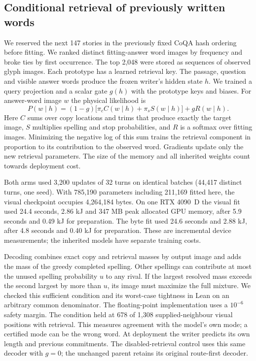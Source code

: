 \documentclass[12pt,a4paper]{article}
\providecommand{\DIFadd}[1]{{\protect\color{blue} \sf #1}} %
\begin{document}
\subsection*{\DIFadd{Conditional retrieval of previously written words}}
\DIFadd{We reserved the next 147 stories in the previously fixed CoQA hash ordering before fitting. We ranked distinct fitting-answer word images by frequency and broke ties by first occurrence. The top 2,048 were stored as sequences of observed glyph images. Each prototype has a learned retrieval key. The passage, question and visible answer words produce the frozen writer's hidden state $h$. We trained a query projection and a scalar gate $g(h)$ with the prototype keys and biases. For answer-word image $w$ the physical likelihood is
}\[
P(w\mid h)=(1-g)\bigl[\pi_c C(w\mid h)+\pi_s S(w\mid h)\bigr]+g R(w\mid h).
\]
\DIFadd{Here $C$ sums over copy locations and trims that produce exactly the target image, $S$ multiplies spelling and stop probabilities, and $R$ is a softmax over fitting images. Minimizing the negative log of this sum trains the retrieval component in proportion to its contribution to the observed word. Gradients update only the new retrieval parameters. The size of the memory and all inherited weights count towards deployment cost.
}

\DIFadd{Both arms used 3,200 updates of 32 turns on identical batches (44,417 distinct turns, one seed). With 785,190 parameters including 211,169 fitted here, the visual checkpoint occupies 4,264,184 bytes. On one RTX 4090~D the visual fit used 24.4 seconds, 2.86 kJ and 347 MB peak allocated GPU memory, after 5.9 seconds and 0.49 kJ for preparation. The byte fit used 24.6 seconds and 2.88 kJ, after 4.8 seconds and 0.40 kJ for preparation. These are incremental device measurements; the inherited models have separate training costs.
}

\DIFadd{Decoding combines exact copy and retrieval masses by output image and adds the mass of the greedy completed spelling. Other spellings can contribute at most the unused spelling probability $u$ to any rival. If the largest resolved mass exceeds the second largest by more than $u$, its image must maximize the full mixture. We checked this sufficient condition and its worst-case tightness in Lean on an arbitrary common denominator. The floating-point implementation uses a $10^{-6}$ safety margin. The condition held at 678 of 1,308 supplied-neighbour visual positions with retrieval. This measures agreement with the model's own mode; a certified mode can be the wrong word. At deployment the writer predicts its own length and previous commitments. The disabled-retrieval control uses this same decoder with $g=0$; the unchanged parent retains its original route-first decoder.
}
\end{document}
